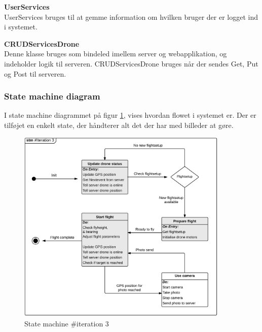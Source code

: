 \textbf{UserServices}\\
UserServices bruges til at gemme information om hvilken bruger der er logget ind i systemet.

\textbf{CRUDServicesDrone}\\
Denne klasse bruges som bindeled imellem server og webapplikation, og indeholder logik til serveren. CRUDServicesDrone bruges når der sendes Get, Put og Post til serveren.


\vspace{0.3cm}

\subsubsection*{State machine diagram}
\vspace{-0.3cm}
I state machine diagrammet på figur \ref{fig:Statemachine_iteration3}, vises hvordan flowet i systemet er. Der er tilføjet en enkelt state, der håndterer alt det der har med billeder at gøre. 

\vspace{-0.2cm}
\begin{figure}[H]
	\centering
	\includegraphics[width=0.9\textwidth]{Billeder/statemachine/State_iteration3.png}
	\caption{State machine \#iteration 3}
	\label{fig:Statemachine_iteration3}
\end{figure}

